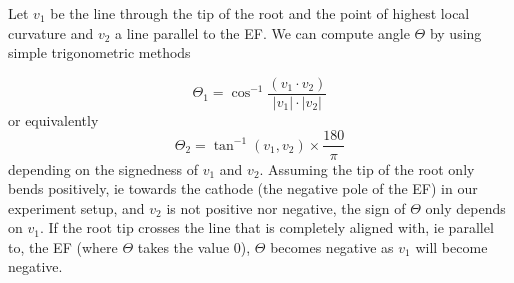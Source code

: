%
%




Let \( v_{1} \) be the line through the tip of the root and the point of highest local curvature and \( v_{2} \) a line parallel to the EF. 
We can compute angle \( \Theta \)  by using simple trigonometric methods 

\begin{equation} \label{angle1}
\Theta_{1}  = \cos^{-1}\frac{( v_{1} \cdot v_{2}) }{ | v_{1} | \cdot | v_{2} |}
\end{equation}
or equivalently
\begin{equation} \label{angle2}
\Theta_{2} = \tan^{-1}( v_{1}, v_{2}) \times \frac{180}{\pi}
\end{equation}
depending on the signedness of \( v_{1} \) and \( v_{2} \). Assuming the tip of the root only bends positively, ie towards the cathode (the negative pole of the EF) in our experiment setup, and \( v_{2} \) is not positive nor negative, the sign of \( \Theta \) only depends on \( v_{1} \). If the root tip crosses the line that is completely aligned with, ie parallel to, the EF (where \( \Theta \) takes the value 0), \( \Theta \) becomes negative as \( v_{1} \) will become negative. 



